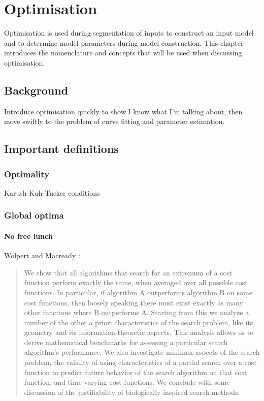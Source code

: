 \chapter{Optimisation}
\begin{overview}
  Optimisation is used during segmentation of inputs to construct an input model and to determine model parameters during model construction.
  This chapter introduces the nomenclature and concepts that will be used when discussing optimisation.
\end{overview}

\section{Background}
Introduce optimisation quickly to show I know what I'm talking about,
then move swiftly to the problem of curve fitting and parameter estimation.

\section{Important definitions}
\subsection{Optimality}
Karush-Kuh-Tucker conditions

\subsection{Global optima}

\subsubsection{No free lunch}
Wolpert and Macready \citehere:

\begin{quote}
  We show that all algorithms that search for an extremum of a cost function perform exactly the same, when averaged over all possible cost functions. In particular, if algorithm A outperforms algorithm B on some cost functions, then loosely speaking there must exist exactly as many other functions where B outperforms A.
Starting from this we analyze a number of the other a priori characteristics of the search problem, like its geometry and its information-theoretic aspects.
This analysis allows us to derive mathematical benchmarks for assessing a particular search algorithm's performance.
We also investigate minimax aspects of the search problem, the validity of using characteristics of a partial search over a cost function to predict future behavior of the search algorithm on that cost function, and time-varying cost functions.
We conclude with some discussion of the justifiability of biologically-inspired search methods.
\end{quote}


